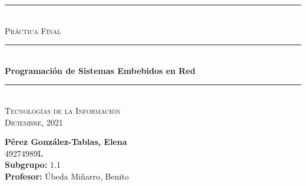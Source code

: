 \begin{titlepage}
	\begin{center}
		\rule{15cm}{0pt} \\
		[3cm]
		\textsc{\Large Práctica Final} \\
		\rule{15cm}{1pt} \\
		[0.25cm]
		\huge{\bfseries Programación de Sistemas Embebidos en Red} \\
		\rule{15cm}{1pt} \\
		\textsc{\Large Tecnologías de la Información} \\
		[0.25cm]
		\textsc{\Large Diciembre, 2021}\\
		[9cm]
	\end{center}
	\begin{flushright}
		\textbf{Pérez González-Tablas, Elena} \\
		[0.25cm]
		49274989L \\
		[0.25cm]
		\textbf{Subgrupo:} 1.1 \\
		[0.25cm]
		\textbf{Profesor:} Úbeda Miñarro, Benito\\
	\end{flushright}
\end{titlepage}
\newpage
\begin{titlepage}
	\begin{flushleft}
	\end{flushleft}
\end{titlepage}